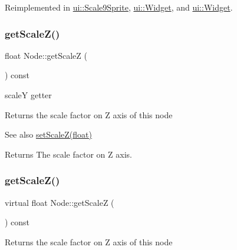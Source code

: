 Reimplemented in \hyperlink{classui_1_1Scale9Sprite_a7bab472ed47f8eb5d061120915f9c2d7}{ui\+::\+Scale9\+Sprite}, \hyperlink{classui_1_1Widget_af9953371b66c5e1a608c5f7f009093fd}{ui\+::\+Widget}, and \hyperlink{classui_1_1Widget_a932098cecbcccacf326a500f9c8177a7}{ui\+::\+Widget}.

\mbox{\label{classNode_a0b55ddbe04d126953e1db8606d9a9ecd}} 
\subsubsection{\texorpdfstring{get\+Scale\+Z()}{getScaleZ()}\hspace{0.1cm}{\footnotesize\ttfamily [1/2]}}
{\footnotesize\ttfamily float Node\+::get\+ScaleZ (\begin{DoxyParamCaption}{ }\end{DoxyParamCaption}) const\hspace{0.3cm}{\ttfamily [virtual]}}



scaleY getter 

Returns the scale factor on Z axis of this node

\begin{DoxySeeAlso}{See also}
{\ttfamily \hyperlink{classNode_a79518b90226335e0997552687eb7b33f}{set\+Scale\+Z(float)}}
\end{DoxySeeAlso}
\begin{DoxyReturn}{Returns}
The scale factor on Z axis. 
\end{DoxyReturn}
\mbox{\label{classNode_aac40998528bbad71f1aca2cfab032aca}} 
\subsubsection{\texorpdfstring{get\+Scale\+Z()}{getScaleZ()}\hspace{0.1cm}{\footnotesize\ttfamily [2/2]}}
{\footnotesize\ttfamily virtual float Node\+::get\+ScaleZ (\begin{DoxyParamCaption}{ }\end{DoxyParamCaption}) const\hspace{0.3cm}{\ttfamily [virtual]}}

Returns the scale factor on Z axis of this node

